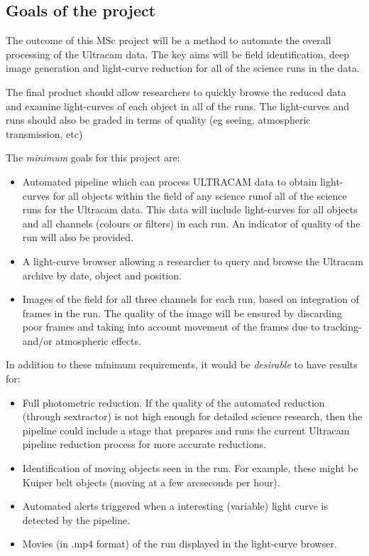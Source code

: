 \documentclass[a4paper,10pt]{article}
\begin{document}
\subsection{Goals of the project}

The outcome of this MSc project will be a method to automate the 
overall processing of the Ultracam data. The key aims will be field 
identification, deep image generation and light-curve reduction for 
all of the science runs in the data. 

The final product should allow researchers to quickly browse the 
reduced data and examine light-curves of each object in all of the 
runs. The light-curves and runs should also be graded in terms of 
quality (eg seeing, atmospheric transmission, etc)

The \emph{minimum} goals for this project are:
\begin{itemize}
	\item Automated pipeline which can process ULTRACAM data to obtain light-curves for all objects within the field of any science runof all of the science runs for the Ultracam data. This data will include light-curves for all objects and all channels (colours or filters) in each run. An indicator of quality of the run will also be provided. 
	\item A light-curve browser allowing a researcher to query and browse the Ultracam archive by date, object and position.
	\item Images of the field for all three channels for each run, based on integration of frames in the run. The quality of the image will be ensured by discarding poor frames and taking into account movement of the frames due to tracking- and/or atmospheric effects. 
\end{itemize}

In addition to these minimum requirements, it would be \emph{desirable} to have results for:

\begin{itemize}
	\item Full photometric reduction. If the quality of the automated reduction (through sextractor) is not high enough for detailed science research, then the pipeline could include a stage that prepares and runs the current Ultracam pipeline reduction process for more accurate reductions.
	\item Identification of moving objects seen in the run. For example, these might be Kuiper belt objects (moving at a few arcseconds per hour).
	\item Automated alerts triggered when a interesting (variable) light curve is detected by the pipeline. 
	\item Movies (in .mp4 format) of the run displayed in the light-curve browser. 
\end{itemize}
\end{document}
